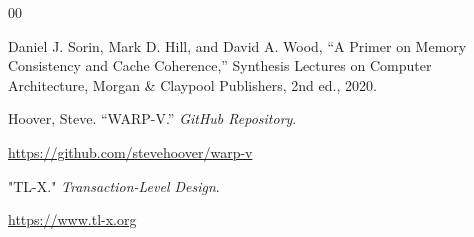 \documentclass[10pt, compsoc]{IEEEtran}
\begin{document}
\begin{thebibliography}{00}

 Daniel J. Sorin, Mark D. Hill, and David A. Wood, ``A Primer on Memory Consistency and Cache Coherence,'' Synthesis Lectures on Computer Architecture, Morgan \& Claypool Publishers, 2nd ed., 2020. 




Hoover, Steve. ``WARP-V.'' \textit{GitHub Repository}.

\url{https://github.com/stevehoover/warp-v}




"TL-X." \textit{Transaction-Level Design}.

\url{https://www.tl-x.org}





\end{thebibliography}
\end{document}
